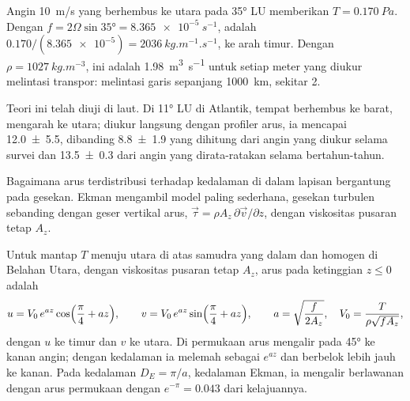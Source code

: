 \begin{example}\label{ex:b1:ocean-circulation:transport}
Angin \qty{10}{m/s} yang berhembus ke utara pada \ang{35} LU memberikan
$T = \qty{0.170}{Pa}$. Dengan $f = 2\Omega\sin\ang{35} = \qty{8.365e-5}{s^{-1}}$, 
adalah $0.170/(\num{8.365e-5}) = \qty{2036}{kg.m^{-1}.s^{-1}}$, ke arah timur. Dengan
$\rho = \qty{1027}{kg.m^{-3}}$, ini adalah \qty{1.98}{m^3.s^{-1}} untuk setiap
meter yang diukur melintasi transpor: melintasi garis sepanjang \qty{1000}{km}, sekitar
\qty{2}{\sverdrup}.
\end{example}

Teori ini telah diuji di laut. Di \ang{11} LU di Atlantik, tempat  berhembus ke barat,  mengarah ke utara; diukur langsung dengan profiler arus, ia
mencapai
\qty[uncertainty-mode=separate]{12.0 \pm 5.5}{\sverdrup}, dibanding
\qty[uncertainty-mode=separate]{8.8 \pm 1.9}{\sverdrup} yang dihitung dari angin yang diukur
selama survei dan
\qty[uncertainty-mode=separate]{13.5 \pm 0.3}{\sverdrup} dari angin yang dirata-ratakan
selama bertahun-tahun.

Bagaimana arus terdistribusi terhadap kedalaman di dalam lapisan bergantung pada gesekan. Ekman mengambil model paling sederhana, gesekan turbulen sebanding dengan geser vertikal arus, $\vec\tau = \rho A_z\,\partial\vec v/\partial z$, dengan viskositas pusaran tetap $A_z$.

\begin{proposition}\label{prop:b1:ocean-circulation:spiral}
Untuk  mantap $T$ menuju utara di atas samudra yang dalam dan homogen di Belahan Utara, dengan viskositas pusaran tetap $A_z$, arus pada ketinggian $z
\leq 0$ adalah
\[
  u = V_0\,e^{az}\cos\Bigl(\frac\pi4 + az\Bigr),\qquad
  v = V_0\,e^{az}\sin\Bigl(\frac\pi4 + az\Bigr),\qquad
  a = \sqrt{\frac{f}{2A_z}},\quad V_0 = \frac{T}{\rho\sqrt{fA_z}},
\]
dengan $u$ ke timur dan $v$ ke utara. Di permukaan arus mengalir pada \ang{45} ke kanan angin; dengan kedalaman ia melemah sebagai $e^{az}$ dan berbelok lebih jauh ke kanan. Pada kedalaman $D_E = \pi/a$, kedalaman Ekman, ia mengalir berlawanan dengan arus permukaan dengan $e^{-\pi} = \num{0.043}$ dari kelajuannya.
\end{proposition}
\admitted

